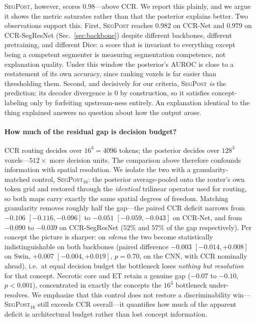 \documentclass[runningheads]{llncs}
\begin{document}
\textsc{SegPost}, however, scores $0.98$---above CCR. We report this plainly, and we argue it
shows the metric saturates rather than that the posterior explains better. Two observations
support this. First, \textsc{SegPost} reaches $0.982$ on CCR-Net and $0.979$ on CCR-SegResNet
(Sec.~\ref{sec:backbone}) despite different backbones, different pretraining, and different Dice:
a score that is invariant to everything except being a competent segmenter is measuring
segmentation competence, not explanation quality. Under this window the posterior's AUROC is
close to a restatement of its own accuracy, since ranking voxels is far easier than thresholding
them. Second, and decisively for our criteria, \textsc{SegPost} \emph{is} the prediction: its
decoder divergence is $0$ by construction, so it satisfies concept-labeling only by forfeiting
upstream-ness entirely. An explanation identical to the thing explained answers no question about
how the output arose.

\paragraph{How much of the residual gap is decision budget?}
CCR routing decides over $16^3{=}4096$ tokens; the posterior decides over $128^3$ voxels---$512\times$
more decision units. The comparison above therefore confounds information with spatial resolution.
We isolate the two with a granularity-matched control, \textsc{SegPost}$_{16}$: the posterior
average-pooled onto the router's own token grid and restored through the \emph{identical}
trilinear operator used for routing, so both maps carry exactly the same spatial degrees of
freedom. Matching granularity removes roughly half the gap---the paired CCR deficit narrows from
$-0.106$ $[-0.116,-0.096]$ to $-0.051$ $[-0.059,-0.043]$ on CCR-Net, and from $-0.090$ to $-0.039$
on CCR-SegResNet ($52\%$ and $57\%$ of the gap respectively). Per concept the picture is sharper:
on \emph{edema} the two become statistically indistinguishable on both backbones (paired
difference $-0.003$ $[-0.014,+0.008]$ on Swin, $+0.007$ $[-0.004,+0.019]$, $p{=}0.70$, on the CNN,
with CCR nominally ahead), i.e.\ at equal decision budget the bottleneck loses \emph{nothing but
resolution} for that concept. Necrotic core and ET retain a genuine gap ($-0.07$ to $-0.10$,
$p<0.001$), concentrated in exactly the concepts the $16^3$ bottleneck under-resolves. We
emphasize that this control does not restore a discriminability win---\textsc{SegPost}$_{16}$
still exceeds CCR overall---it quantifies how much of the apparent deficit is architectural
budget rather than lost concept information.
\end{document}
